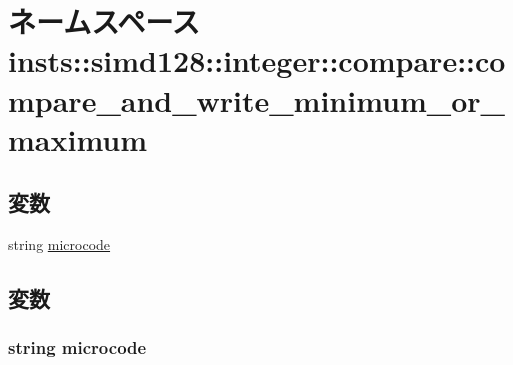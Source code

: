 \hypertarget{namespaceinsts_1_1simd128_1_1integer_1_1compare_1_1compare__and__write__minimum__or__maximum}{
\section{ネームスペース insts::simd128::integer::compare::compare\_\-and\_\-write\_\-minimum\_\-or\_\-maximum}
\label{namespaceinsts_1_1simd128_1_1integer_1_1compare_1_1compare__and__write__minimum__or__maximum}
}
\subsection*{変数}
\begin{DoxyCompactItemize}
\item 
string \hyperlink{namespaceinsts_1_1simd128_1_1integer_1_1compare_1_1compare__and__write__minimum__or__maximum_a770f11a173e99389a8802f0107ed8f52}{microcode}
\end{DoxyCompactItemize}


\subsection{変数}
\hypertarget{namespaceinsts_1_1simd128_1_1integer_1_1compare_1_1compare__and__write__minimum__or__maximum_a770f11a173e99389a8802f0107ed8f52}{
\subsubsection[{microcode}]{\setlength{\rightskip}{0pt plus 5cm}string {\bf microcode}}}
\label{namespaceinsts_1_1simd128_1_1integer_1_1compare_1_1compare__and__write__minimum__or__maximum_a770f11a173e99389a8802f0107ed8f52}
